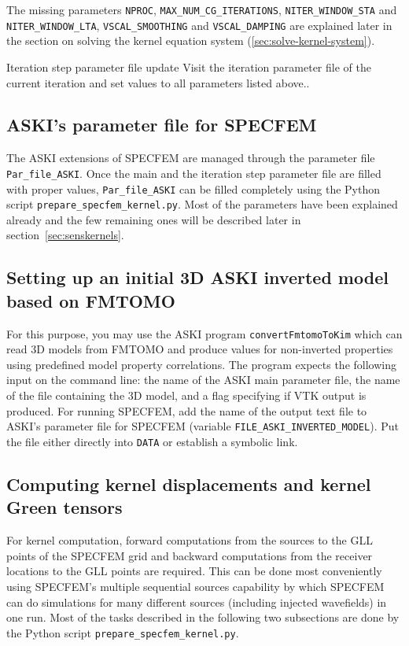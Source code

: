 The missing parameters \verb+NPROC+, \verb+MAX_NUM_CG_ITERATIONS+, \verb+NITER_WINDOW_STA+ and \verb+NITER_WINDOW_LTA+, \verb+VSCAL_SMOOTHING+ and \verb+VSCAL_DAMPING+ are explained later in the section on solving the kernel equation system (\ref{sec:solve-kernel-system}).
%
 \begin{actionbox}[label={action:update-iter-parfile},float=h!]{Iteration step parameter file update}
    Visit the iteration parameter file of the current iteration and set values to all parameters listed above..
 \end{actionbox}
%
\subsection{ASKI's parameter file for SPECFEM}
%
 The ASKI extensions of SPECFEM are managed through the parameter file \verb+Par_file_ASKI+. Once the main and the iteration step parameter file are filled with proper values, \verb+Par_file_ASKI+ can be filled completely using the Python script \verb+prepare_specfem_kernel.py+. Most of the parameters have been explained already and the few remaining ones will be described later in section~\ref{sec:senskernels}.
%
\subsection{Setting up an initial 3D ASKI inverted model based on FMTOMO}
%
For this purpose, you may use the ASKI program \verb+convertFmtomoToKim+ which can read 3D models from FMTOMO and produce values for non-inverted properties using predefined model property correlations. The program expects the following input on the command line:
the name of the ASKI main parameter file, the name of the file containing the 3D model, and a flag specifying if VTK output is produced. For running SPECFEM, add the name of the output text file to ASKI's parameter file for SPECFEM (variable \verb+FILE_ASKI_INVERTED_MODEL+). Put the file either directly into \verb+DATA+ or establish a symbolic link.
%
\subsection{Computing kernel displacements and kernel Green tensors}
%
For kernel computation, forward computations from the sources to the GLL points of the SPECFEM grid and backward computations from the receiver locations to the GLL points are required. This can be done most conveniently using SPECFEM's multiple sequential sources capability by which SPECFEM can do simulations for many different sources (including injected wavefields) in one run. Most of the tasks described in the following two subsections are done by the Python script \verb+prepare_specfem_kernel.py+.
%

